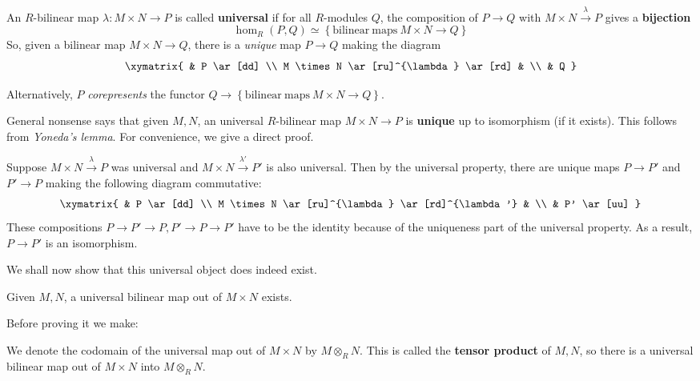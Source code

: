 \begin{definition}
An $R$-bilinear map $\lambda: M \times N \to P$ is called \textbf{universal} if
for all $R$-modules $Q$, the composition of $P \to Q$ with $M \times N
\stackrel{\lambda}{\to} P$
gives a \textbf{bijection}
\[ \hom_R(P,Q) \simeq \left\{\mathrm{bilinear \ maps} \ M \times N \to
Q\right\}  \]
So, given a bilinear map $M \times N \to Q$, there is a \textit{unique} map $P
\to Q$ making the diagram
\[
\xymatrix{
& P \ar[dd] \\
M \times N \ar[ru]^{\lambda} \ar[rd] & \\
& Q
}
\]

Alternatively, $P$ \emph{corepresents} the functor $Q \to
\left\{\mathrm{bilinear \ maps \ } M \times N \to Q\right\}$.
\end{definition}

General nonsense says that given $M,N$, an universal $R$-bilinear map $M
\times N \to P$ is
\textbf{unique} up to isomorphism (if it exists). This  follows from \emph{Yoneda's lemma}.
For convenience, we give a direct proof.

Suppose $M \times N \stackrel{\lambda}{\to} P$ was universal and $M \times N
\stackrel{\lambda'}{\to} P'$ is also
universal. Then by the universal property, there are unique maps $P \to P'$
and $P' \to P$ making the
following diagram commutative:
\[
\xymatrix{
& P \ar[dd] \\
M \times N \ar[ru]^{\lambda} \ar[rd]^{\lambda'} & \\
& P' \ar[uu]
}
\]
These compositions $P \to P' \to P, P' \to P \to P'$ have to be the identity
because of the uniqueness part of the universal property.
As a result, $P \to P'$ is an isomorphism.

We shall now show that this universal object does indeed exist.

\begin{proposition} \label{tensorexists}
Given $M,N$, a universal bilinear map out of $M \times N$ exists.
\end{proposition}

Before proving it we make:
\begin{definition}
We denote the codomain of the universal map out of $M \times N $ by $M
\otimes_R N$. This is called the \textbf{tensor product} of $M,N$, so there
is a universal bilinear map out of $M \times N$ into $M \otimes_R N$.
\end{definition}

